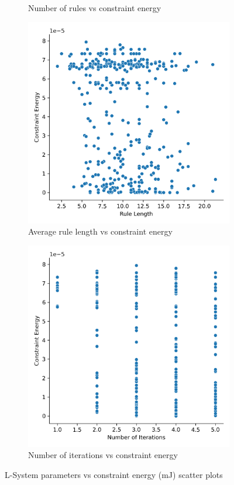 \begin{figure}[H]
\begin{subfigure}[c]{0.45\textwidth}
		\caption{Number of rules vs constraint energy}
	\end{subfigure}
	\hfill
	\begin{subfigure}[c]{0.45\textwidth}
		\centering
		\includegraphics[width=\textwidth]{rl_vs_ce.png}
		\caption{Average rule length vs constraint energy}
	\end{subfigure}
	\hfill
	\begin{subfigure}[c]{0.45\textwidth}
		\centering
		\includegraphics[width=\textwidth]{noi_vs_ce.png}
		\caption{Number of iterations vs constraint energy}
	\end{subfigure}
	\caption[L-System parameters vs constraint energy]{L-System parameters vs constraint energy (\si{mJ}) scatter plots}
	\label{fig:ls_v_ce}
\end{figure}

